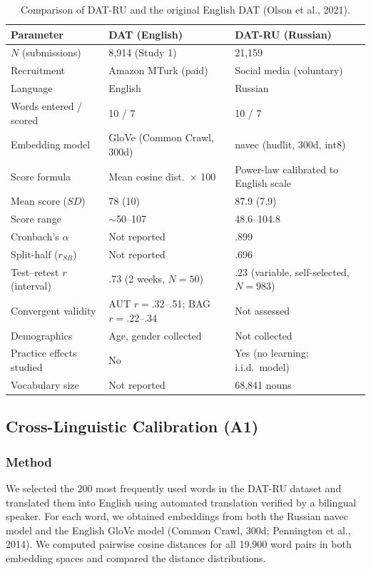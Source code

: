 \documentclass[12pt]{article}
\begin{document}
\begin{table}[htbp]
\centering
\caption{Comparison of DAT-RU and the original English DAT (Olson et al., 2021).}
\label{tab:comparison}
\small
\begin{tabular}{@{}lll@{}}
\toprule
Parameter & DAT (English) & DAT-RU (Russian) \\
\midrule
$N$ (submissions) & 8,914 (Study 1) & 21,159 \\
Recruitment & Amazon MTurk (paid) & Social media (voluntary) \\
Language & English & Russian \\
Words entered / scored & 10 / 7 & 10 / 7 \\
Embedding model & GloVe (Common Crawl, 300d) & navec (hudlit, 300d, int8) \\
Score formula & Mean cosine dist.\ $\times$ 100 & Power-law calibrated to English scale \\
Mean score ($SD$) & 78 (10) & 87.9 (7.9) \\
Score range & $\sim$50--107 & 48.6--104.8 \\
Cronbach's $\alpha$ & Not reported & .899 \\
Split-half ($r_{SB}$) & Not reported & .696 \\
Test--retest $r$ (interval) & .73 (2 weeks, $N = 50$) & .23 (variable, self-selected, $N = 983$) \\
Convergent validity & AUT $r = .32$--.51; BAG $r = .22$--.34 & Not assessed \\
Demographics & Age, gender collected & Not collected \\
Practice effects studied & No & Yes (no learning; i.i.d.\ model) \\
Vocabulary size & Not reported & 68,841 nouns \\
\bottomrule
\end{tabular}
\end{table}

\subsection{Cross-Linguistic Calibration (A1)}

\subsubsection{Method}

We selected the 200 most frequently used words in the DAT-RU dataset and translated them into English using automated translation verified by a bilingual speaker. For each word, we obtained embeddings from both the Russian navec model and the English GloVe model (Common Crawl, 300d; Pennington et al., 2014). We computed pairwise cosine distances for all 19,900 word pairs in both embedding spaces and compared the distance distributions.
\end{document}
